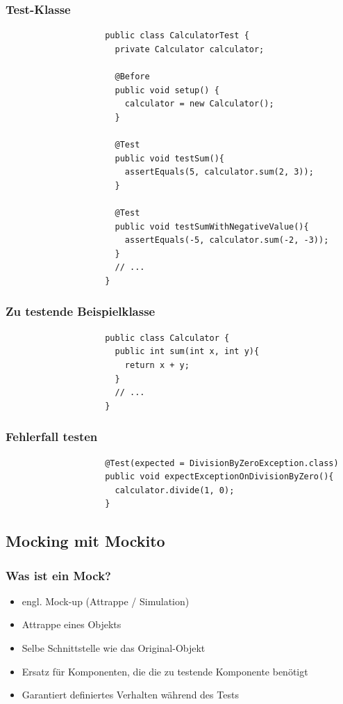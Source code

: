 \documentclass{beamer}
\begin{document}
			\begin{frame}[fragile]
				\frametitle{Test-Klasse}

				\begin{lstlisting}
					public class CalculatorTest {
					  private Calculator calculator;

					  @Before
					  public void setup() {
					    calculator = new Calculator();
					  }

					  @Test
					  public void testSum(){
					    assertEquals(5, calculator.sum(2, 3));
					  }

					  @Test
					  public void testSumWithNegativeValue(){
					    assertEquals(-5, calculator.sum(-2, -3));
					  }
					  // ...
					}
				\end{lstlisting}
			\end{frame}
		
			\begin{frame}[fragile]
				\frametitle{Zu testende Beispielklasse}

				\begin{lstlisting}
					public class Calculator {
					  public int sum(int x, int y){
					    return x + y;
					  }
					  // ...
					}
				\end{lstlisting}
			\end{frame}

			\begin{frame}[fragile]
				\frametitle{Fehlerfall testen}

				\begin{lstlisting}
					@Test(expected = DivisionByZeroException.class)
					public void expectExceptionOnDivisionByZero(){
					  calculator.divide(1, 0);
					}
				\end{lstlisting}
			\end{frame}

		\subsection{Mocking mit Mockito}

			\begin{frame}
				\frametitle{Was ist ein Mock?}

				\begin{itemize}
					\item{engl. Mock-up (Attrappe / Simulation)}
					\item{Attrappe eines Objekts}
					\item{Selbe Schnittstelle wie das Original-Objekt}
					\item{Ersatz für Komponenten, die die zu testende Komponente benötigt}
					\item{Garantiert definiertes Verhalten während des Tests}
				\end{itemize}
			\end{frame}
\end{document}
